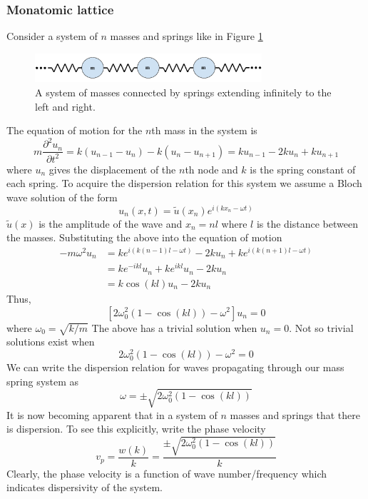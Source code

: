 \documentclass{article}
\begin{document}
\subsubsection{Monatomic lattice} \label{monatomic}
Consider a system of $n$ masses and springs like in Figure \ref{fig:ms} 
\begin{figure}[!htbp]
	\centering
	\includegraphics[width=0.75\textwidth]{mass-spring.pdf}
	\caption{A system of masses connected by springs extending infinitely to 
	the left and right.}
	\label{fig:ms}
\end{figure}
The equation of motion for the $n$th mass in the system is
\begin{equation} \label{eqnms}
m\frac{\partial^2 u_n}{\partial t^2} = k(u_{n-1} - u_n) - k(u_n - u_{n+1}) = 
ku_{n-1} - 2ku_n + ku_{n+1} 
\end{equation}
where $u_n$ gives the displacement of the $n$th node and $k$ is the spring 
constant of each spring. To acquire the dispersion relation for this system we 
assume a Bloch wave solution of the form
\begin{equation} \label{bloch}
u_n(x,t) = \tilde{u}(x_n)e^{i(kx_n - \omega t)}
\end{equation}
$\tilde{u}(x)$ is the amplitude of the wave and $x_n = nl$ where $l$ is the 
distance between the masses. Substituting the above into the equation of motion
\begin{align*}
-m \omega^2 u_n   &= ke^{i(k(n-1)l - \omega t)} - 2ku_n + ke^{i(k(n+1)l - 
\omega t)} \\
&= ke^{-ikl}u_n + ke^{ikl}u_n - 2ku_n \\
&= k\cos(kl)u_n - 2ku_n
\end{align*}
Thus,
\begin{equation}
\left[2\omega_0^2(1 - \cos(kl)) - \omega^2\right]u_n = 0
\end{equation}
where $\omega_0 = \sqrt{k/m}$ The above has a trivial solution when $u_n = 0$. 
Not so trivial solutions exist when
\begin{equation}
2\omega_0^2(1 - \cos(kl)) - \omega^2= 0
\end{equation}
We can write the dispersion relation for waves propagating through our mass 
spring system as
\begin{equation} \label{monatomicdisp}
\omega = \pm \sqrt{2\omega_0^2(1 - \cos(kl))}
\end{equation}
It is now becoming apparent that in a system of $n$ masses and springs that 
there is dispersion. To see this explicitly, write the phase velocity
\begin{equation}
v_p = \frac{w(k)}{k} = \frac{\pm\sqrt{2\omega_0^2(1 - \cos(kl))}}{k}
\end{equation}
Clearly, the phase velocity is a function of wave number/frequency which 
indicates dispersivity of the system.
\end{document}
